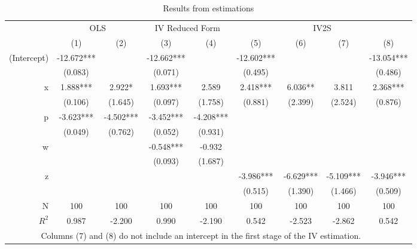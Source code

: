 \begin{table}[htb]
\centering
\caption{Results from estimations}
\begin{tabular}{r|cc|cc|cccc}
\toprule
            & \multicolumn{2}{c}{OLS} & \multicolumn{2}{c}{IV Reduced Form} & \multicolumn{4}{c}{IV2S}                        \\
            & (1)         & (2)       & (3)              & (4)             & (5)        & (6)       & (7)       & (8)        \\ \hline
(Intercept) &  -12.672*** &           &       -12.662*** &                 & -12.602*** &           &           & -13.054*** \\
            &     (0.083) &           &          (0.071) &                 &    (0.495) &           &           &    (0.486) \\
          x &    1.888*** &    2.922* &         1.693*** &           2.589 &   2.418*** &   6.036** &     3.811 &   2.368*** \\
            &     (0.106) &   (1.645) &          (0.097) &         (1.758) &    (0.881) &   (2.399) &   (2.524) &    (0.876) \\
          p &   -3.623*** & -4.502*** &        -3.452*** &       -4.208*** &            &           &           &            \\
            &     (0.049) &   (0.762) &          (0.052) &         (0.931) &            &           &           &            \\
          w &             &           &        -0.548*** &          -0.932 &            &           &           &            \\
            &             &           &          (0.093) &         (1.687) &            &           &           &            \\
          z &             &           &                  &                 &  -3.986*** & -6.629*** & -5.109*** &  -3.946*** \\
            &             &           &                  &                 &    (0.515) &   (1.390) &   (1.466) &    (0.509) \\ \hline
          N &         100 &       100 &              100 &             100 &        100 &       100 &       100 &        100 \\
      $R^2$ &       0.987 &    -2.200 &            0.990 &          -2.190 &      0.542 &    -2.523 &    -2.862 &      0.542 \\
\bottomrule
\multicolumn{8}{p{.8\textwidth}}{\small Columns (7) and (8) do not include an intercept in the first stage of the IV estimation.}
\end{tabular}
\end{table}